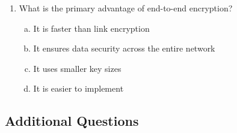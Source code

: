 \documentclass[12pt]{article}
\begin{document}
\begin{enumerate}
    \item What is the primary advantage of end-to-end encryption?
    \begin{enumerate}[(a)]
        \item It is faster than link encryption
        \item It ensures data security across the entire network
        \item It uses smaller key sizes
        \item It is easier to implement
    \end{enumerate}
\end{enumerate}

\subsection*{Additional Questions}
\end{document}
